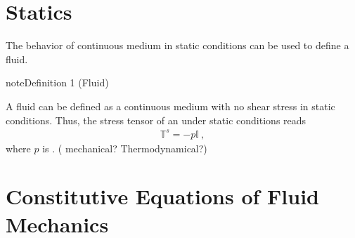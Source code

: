 \documentclass[letterpaper,10pt,english]{jupyterBook}
\begin{document}
\sphinxstepscope


\chapter{Statics}
\label{\detokenize{ch/fluids/statics:statics}}\label{\detokenize{ch/fluids/statics:fluid-mechanics-statics}}\label{\detokenize{ch/fluids/statics::doc}}
\sphinxAtStartPar
The behavior of continuous medium in static conditions can be used to define a fluid.
\label{ch/fluids/statics:definition-0}
\begin{sphinxadmonition}{note}{Definition 1 (Fluid)}



\sphinxAtStartPar
A fluid can be defined as a continuous medium with no shear stress in static conditions. Thus, the stress tensor of an  under static conditions reads
\begin{equation*}
\begin{split}\mathbb{T}^s = - p \mathbb{I} \ ,\end{split}
\end{equation*}
\sphinxAtStartPar
where \(p\) is . ( mechanical? Thermodynamical?)
\end{sphinxadmonition}

\sphinxstepscope


\chapter{Constitutive Equations of Fluid Mechanics}
\label{\detokenize{ch/fluids/constitutive-equations:constitutive-equations-of-fluid-mechanics}}\label{\detokenize{ch/fluids/constitutive-equations:fluid-mechanics-constutive-equations}}\label{\detokenize{ch/fluids/constitutive-equations::doc}}
\end{document}
